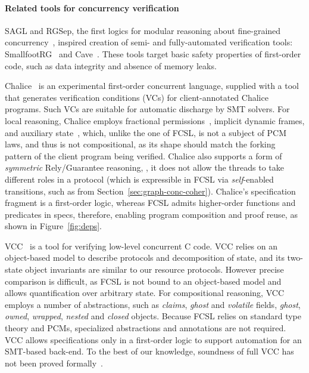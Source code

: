 \paragraph{Related tools for concurrency verification}
%
SAGL and RGSep, the first logics for modular reasoning about
fine-grained
concurrency~\cite{Feng-al:ESOP07,Vafeiadis-Parkinson:CONCUR07},
inspired creation of semi- and fully-automated verification tools:
SmallfootRG~\cite{Calcagno-al:SAS07} and
Cave~\cite{Vafeiadis:VMCAI10}.
%
These tools target basic safety properties of first-order code,  such
as data integrity and absence of memory leaks.

Chalice~\cite{Leino-Muller:ESOP09} is an experimental first-order
concurrent language, supplied with a tool that generates
verification conditions (VCs) for client-annotated Chalice
programs. Such VCs are suitable for automatic discharge by SMT
solvers.
%
%
For local reasoning, Chalice employs fractional
permissions~\cite{Bornat-al:POPL05}, implicit dynamic frames, and
auxiliary state~\cite{Leino-al:FOSAD09}, which, unlike the one of
FCSL, is not a subject of PCM laws, and thus is not compositional, as
its shape should match the forking pattern of the client program being
verified.
%
Chalice also supports a form of \emph{symmetric} Rely/Guarantee
reasoning, \ie, it does not allow the threads to take different roles
in a protocol (which is expressible in FCSL via \emph{self}-enabled
transitions, such as  from
Section~\ref{sec:graph-conc-coher}).
%
Chalice's specification fragment is a first-order logic, whereas FCSL
admits higher-order functions and predicates in specs, therefore,
enabling program composition and proof reuse, as shown in
Figure~\ref{fig:deps}.

VCC~\cite{Cohen-al:TPHOL09} is a tool for verifying low-level
concurrent C code.  VCC relies on an object-based model to describe
protocols and decomposition of state, and its two-state object
invariants are similar to our resource protocols. However precise
comparison is difficult, as FCSL is not bound to an object-based model
and allows quantification over arbitrary state. For compositional
reasoning, VCC employs a number of abstractions, such as
\emph{claims}, \emph{ghost} and \emph{volatile} fields, \emph{ghost},
\emph{owned}, \emph{wrapped}, \emph{nested} and \emph{closed}
objects. Because FCSL relies on standard type theory and PCMs,
specialized abstractions and annotations are not required. VCC allows
specifications only in a first-order logic to support automation for
an SMT-based back-end. To the best of our knowledge, soundness of full
VCC has not been proved formally~\cite{Cohen-al:SOFSEM13}.

